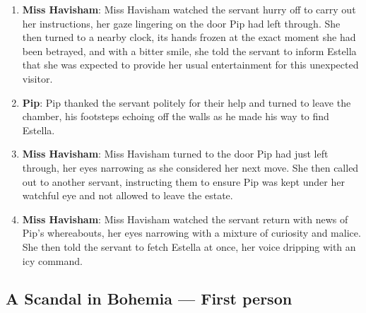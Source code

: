 \documentclass[10pt]{article}
\begin{document}
\begin{enumerate}
\item \textbf{Miss Havisham}: Miss Havisham watched the servant hurry off to carry out her instructions, her gaze lingering on the door Pip had left through. She then turned to a nearby clock, its hands frozen at the exact moment she had been betrayed, and with a bitter smile, she told the servant to inform Estella that she was expected to provide her usual entertainment for this unexpected visitor.

\item \textbf{Pip}: Pip thanked the servant politely for their help and turned to leave the chamber, his footsteps echoing off the walls as he made his way to find Estella.

\item \textbf{Miss Havisham}: Miss Havisham turned to the door Pip had just left through, her eyes narrowing as she considered her next move. She then called out to another servant, instructing them to ensure Pip was kept under her watchful eye and not allowed to leave the estate.

\item \textbf{Miss Havisham}: Miss Havisham watched the servant return with news of Pip's whereabouts, her eyes narrowing with a mixture of curiosity and malice. She then told the servant to fetch Estella at once, her voice dripping with an icy command.

\end{enumerate}

\subsection*{A Scandal in Bohemia --- First person}
\end{document}
